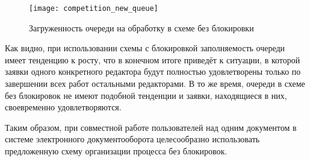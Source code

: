 \begin{figure}[h!]
  \centering
  \texttt{[image: competition\_new\_queue]}
  \caption{Загруженность очереди на обработку в схеме без блокировки}
  \label{img:competition_new_queue}
\end{figure}

\vspace{\baselineskip}
Как видно, при использовании схемы с блокировкой заполняемость очереди имеет тенденцию к росту, что в конечном итоге приведёт к ситуации, в которой заявки одного конкретного редактора будут полностью удовлетворены только по завершении всех работ остальными редакторами. В то же время, очереди в схеме без блокировок не имеют подобной тенденции и заявки, находящиеся в них, своевременно удовлетворяются.

\vspace{\baselineskip}
Таким образом, при совместной работе пользователей над одним документом в системе электронного документооборота целесообразно использовать предложенную схему организации процесса без блокировок.